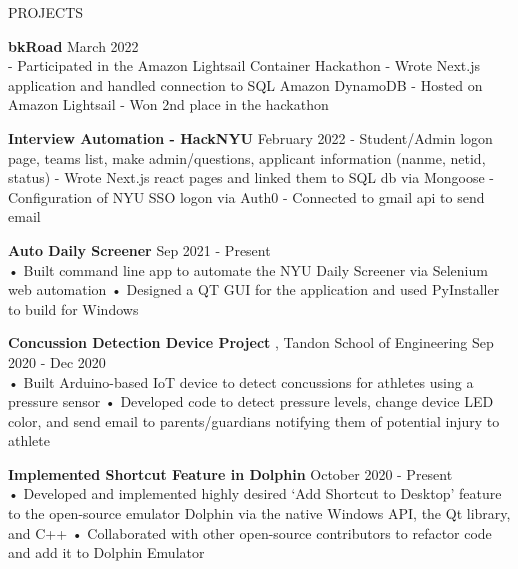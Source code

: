 \documentclass{resume} %
\begin{document}
\begin{rSection}{PROJECTS}

\textbf{\bf bkRoad } \hfill March 2022 \\
- Participated in the Amazon Lightsail Container Hackathon \newline
- Wrote Next.js application and handled connection to SQL Amazon DynamoDB \newline
- Hosted on Amazon Lightsail \newline
- Won 2nd place in the hackathon \newline

\textbf{\bf Interview Automation - HackNYU} \hfill February 2022 \newline
- Student/Admin logon page, teams list, make admin/questions, applicant information (nanme, netid, status) \newline
- Wrote Next.js react pages and linked them to SQL db via Mongoose \newline
- Configuration of NYU SSO logon via Auth0 \newline
- Connected to gmail api to send email \newline



\textbf{\bf Auto Daily Screener } \hfill Sep 2021 - Present \\%
• Built command line app to automate the NYU Daily Screener via Selenium web automation
\newline
• Designed a QT GUI for the application and used PyInstaller to build for Windows

\textbf{\bf Concussion Detection Device Project }, Tandon School of Engineering \hfill Sep 2020 - Dec 2020 \\%
• Built Arduino-based IoT device to detect concussions for athletes using a pressure sensor
\newline
• Developed code to detect pressure levels, change device LED color, and send email to parents/guardians notifying them of potential injury to athlete


\textbf{\bf Implemented Shortcut Feature in Dolphin } \hfill October 2020 - Present \\%
• Developed and implemented highly desired ‘Add Shortcut to Desktop’ feature to the open-source emulator Dolphin via the native Windows API, the Qt library, and C++
\newline
• Collaborated with other open-source contributors to refactor code and add it to Dolphin Emulator


\end{rSection} 
\end{document}
